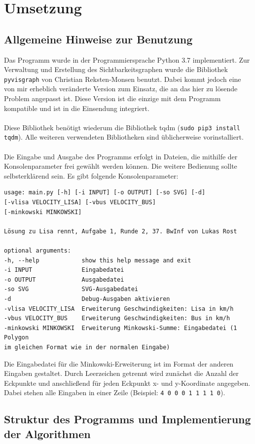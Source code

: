 \documentclass[a4paper, notitlepage, 12pt]{scrartcl}
\begin{document}
\section{Umsetzung}
\subsection{Allgemeine Hinweise zur Benutzung}
Das Programm wurde in der Programmiersprache Python 3.7 implementiert. Zur Verwaltung und Erstellung des Sichtbarkeitsgraphen wurde die Bibliothek \texttt{pyvisgraph} von Christian Reksten-Monsen benutzt. Dabei kommt jedoch eine von mir erheblich veränderte Version zum Einsatz, die an das hier zu lösende Problem angepasst ist. Diese Version ist die einzige mit dem Programm kompatible und ist in die Einsendung integriert. \\ \\ Diese Bibliothek benötigt wiederum die Bibliothek tqdm (\texttt{sudo pip3 install tqdm}). Alle weiteren verwendeten Bibliotheken sind üblicherweise vorinstalliert. \\ \\
Die Eingabe und Ausgabe des Programms erfolgt in Dateien, die mithilfe der Konsolenparameter frei gewählt werden können. Die weitere Bedienung sollte selbsterklärend sein. Es gibt folgende Konsolenparameter:
\begin{verbatim}
usage: main.py [-h] [-i INPUT] [-o OUTPUT] [-so SVG] [-d]
[-vlisa VELOCITY_LISA] [-vbus VELOCITY_BUS]
[-minkowski MINKOWSKI]

Lösung zu Lisa rennt, Aufgabe 1, Runde 2, 37. BwInf von Lukas Rost

optional arguments:
-h, --help            show this help message and exit
-i INPUT              Eingabedatei
-o OUTPUT             Ausgabedatei
-so SVG               SVG-Ausgabedatei
-d                    Debug-Ausgaben aktivieren
-vlisa VELOCITY_LISA  Erweiterung Geschwindigkeiten: Lisa in km/h
-vbus VELOCITY_BUS    Erweiterung Geschwindigkeiten: Bus in km/h
-minkowski MINKOWSKI  Erweiterung Minkowski-Summe: Eingabedatei (1 Polygon
im gleichen Format wie in der normalen Eingabe)
\end{verbatim}
Die Eingabedatei für die Minkowski-Erweiterung ist im Format der anderen Eingaben gestaltet. Durch Leerzeichen getrennt wird zunächst die Anzahl der Eckpunkte und anschließend für jeden Eckpunkt x- und y-Koordinate angegeben. Dabei stehen alle Eingaben in einer Zeile (Beispiel: \texttt{4 0 0 0 1 1 1 1 0}).
\subsection{Struktur des Programms und Implementierung der Algorithmen}
\end{document}
